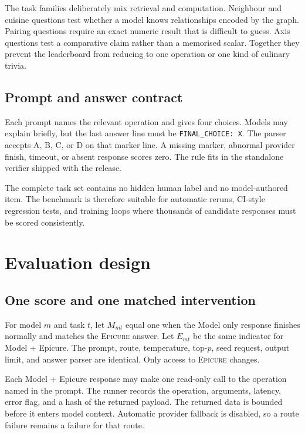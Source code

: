 \documentclass{article}
\newcommand{\epicure}{\textsc{Epicure}}
\begin{document}
The task families deliberately mix retrieval and computation. Neighbour and cuisine questions test
whether a model knows relationships encoded by the graph. Pairing questions require an exact
numeric result that is difficult to guess. Axis questions test a comparative claim rather than a
memorised scalar. Together they prevent the leaderboard from reducing to one operation or one
kind of culinary trivia.

\subsection{Prompt and answer contract}

Each prompt names the relevant operation and gives four choices. Models may explain briefly, but
the last answer line must be \texttt{FINAL\_CHOICE: X}. The parser accepts A, B, C, or D on that
marker line. A missing marker, abnormal provider finish, timeout, or absent response scores zero.
The rule fits in the standalone verifier shipped with the release.

The complete task set contains no hidden human label and no model-authored item. The benchmark is
therefore suitable for automatic reruns, CI-style regression tests, and training loops where
thousands of candidate responses must be scored consistently.

\section{Evaluation design}
\label{sec:design}

\subsection{One score and one matched intervention}

For model $m$ and task $t$, let $M_{mt}$ equal one when the Model only response finishes normally
and matches the \epicure{} answer. Let $E_{mt}$ be the same indicator for Model + Epicure. The
prompt, route, temperature, top-$p$, seed request, output limit, and answer parser are identical.
Only access to \epicure{} changes.

Each Model + Epicure response may make one read-only call to the operation named in the prompt. The
runner records the operation, arguments, latency, error flag, and a hash of the returned payload.
The returned data is bounded before it enters model context. Automatic provider fallback is
disabled, so a route failure remains a failure for that route.
\end{document}
